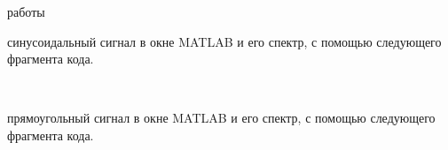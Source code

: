 \documentclass[a4paper,12pt]{article}
\begin{document}
{ работы}
\begin{enumerate}
{ синусоидальный сигнал в окне MATLAB и его спектр, с помощью следующего фрагмента кода.

\\}

{ прямоугольный сигнал в окне MATLAB и его спектр, с помощью следующего фрагмента кода.

}
\end{enumerate}
\end{document}
